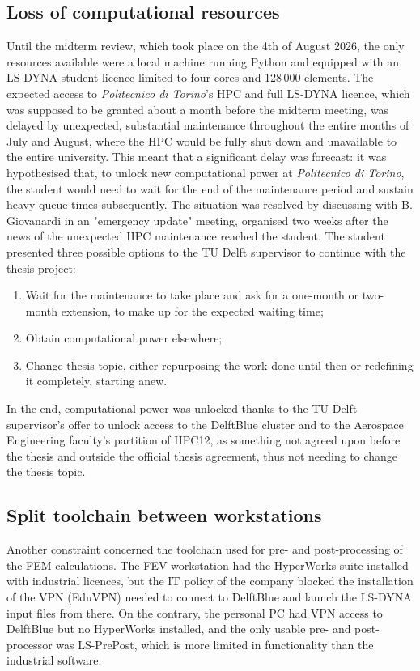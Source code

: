 \subsection{Loss of computational resources}
\label{subsec:pm-hpc}
Until the midterm review, which took place on the 4th of August 2026, the only resources available were a local machine running Python and equipped with an LS-DYNA student licence limited to four cores and 128\,000 elements. The expected access to \textit{Politecnico di Torino}'s HPC and full LS-DYNA licence, which was supposed to be granted about a month before the midterm meeting, was delayed by unexpected, substantial maintenance throughout the entire months of July and August, where the HPC would be fully shut down and unavailable to the entire university. This meant that a significant delay was forecast: it was hypothesised that, to unlock new computational power at \textit{Politecnico di Torino}, the student would need to wait for the end of the maintenance period and sustain heavy queue times subsequently. The situation was resolved by discussing with B. Giovanardi in an "emergency update" meeting, organised two weeks after the news of the unexpected HPC maintenance reached the student. The student presented three possible options to the TU Delft supervisor to continue with the thesis project:
\begin{enumerate}
    \item Wait for the maintenance to take place and ask for a one-month or two-month extension, to make up for the expected waiting time;
    \item Obtain computational power elsewhere;
    \item Change thesis topic, either repurposing the work done until then or redefining it completely, starting anew.
\end{enumerate}

In the end, computational power was unlocked thanks to the TU Delft supervisor's offer to unlock access to the DelftBlue cluster and to the Aerospace Engineering faculty's partition of HPC12, as something not agreed upon before the thesis and outside the official thesis agreement, thus not needing to change the thesis topic.

 
\subsection{Split toolchain between workstations}
\label{subsec:pm-toolchain}
Another constraint concerned the toolchain used for pre- and post-processing of the FEM calculations. The FEV workstation had the HyperWorks suite installed with industrial licences, but the IT policy of the company blocked the installation of the VPN (EduVPN) needed to connect to DelftBlue and launch the LS-DYNA input files from there. On the contrary, the personal PC had VPN access to DelftBlue but no HyperWorks installed, and the only usable pre- and post-processor was LS-PrePost, which is more limited in functionality than the industrial software.

